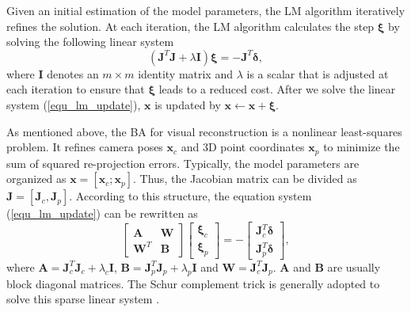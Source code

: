 \documentclass{vgtc}                          %
\begin{document}
Given an initial estimation of the model parameters, the  LM algorithm iteratively refines the solution. At each iteration, the LM algorithm calculates the step $\bm{\xi}$ by solving the following linear system
\begin{equation} \label{equ_lm_update}
	\left( \mathbf{J}^{T} \mathbf{J}+\lambda\mathbf{I}\right) \bm{\xi} =  -\mathbf{J}^{T} \bm{\delta},
\end{equation}
where $\mathbf{I}$ denotes an $m \times m$ identity matrix and  $\lambda$ is a scalar that is adjusted at each iteration to ensure that $\bm{\xi}$ leads to a reduced cost.   After we solve the linear system (\ref{equ_lm_update}), $\mathbf{x}$ is updated by $\mathbf{x} \leftarrow \mathbf{x} + \bm{\xi}$. 

As mentioned above, the BA for visual reconstruction is a nonlinear least-squares problem. It  refines  camera poses $\mathbf{x}_c$ and 3D point coordinates $\mathbf{x}_p$  to minimize the sum of squared re-projection errors. Typically, the model parameters are  organized as $\mathbf{x} = \left[ \mathbf{x}_c; \mathbf{x}_p\right] $. Thus, the Jacobian matrix can be divided as $\mathbf{J} = \left[ \mathbf{J}_c, \mathbf{J}_p\right] $.   According to this structure, the equation system (\ref{equ_lm_update}) can be  rewritten as
\begin{equation} \label{equ_lm_block}
	\begin{bmatrix}
		\mathbf{A} & \mathbf{W}  \\ 
		\mathbf{W}^{T} & \mathbf{B} 
	\end{bmatrix}
	\begin{bmatrix}
		\bm{\xi}_c \\
		\bm{\xi}_p
	\end{bmatrix} =%
	-\begin{bmatrix}
		\mathbf{J}_c^T \bm{\delta} \\
		\mathbf{J}_p^T \bm{\delta}
	\end{bmatrix},
\end{equation}
where $\mathbf{A} = \mathbf{J}_c^T\mathbf{J}_c + \lambda_c\mathbf{I}$, $\mathbf{B} = \mathbf{J}_p^T\mathbf{J}_p +  \lambda_p\mathbf{I}$ and  $\mathbf{W} = \mathbf{J}_c^T\mathbf{J}_p $. $\mathbf{A}$ and $\mathbf{B}$ are usually  block diagonal matrices. The Schur complement trick is generally adopted to solve this sparse linear system \cite{triggs1999bundle}.
\end{document}
